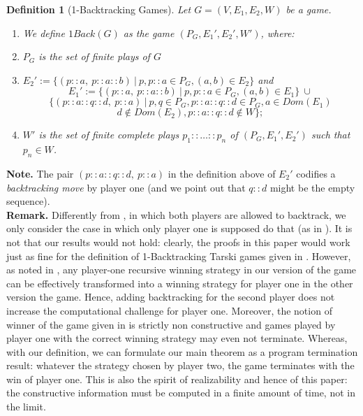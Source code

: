 \documentclass[copyright,creativecommons]{eptcs}
\newtheorem{definition}{Definition}
\begin{document}
\begin{definition}[1-Backtracking Games]
\label{definition-1BacktrackingGames} Let
$G=(V,E_1,E_2,W)$ be a game.

\begin{enumerate}

\item
We define $1Back(G)$ as the game $(P_G, E_1',E_2', W')$, where:\\
\item $P_G$ is the set of finite plays of $G$\\

\item  $E_2':=\{(p::a,\ p::a::b)\ |\  p, p::a\in P_G,
(a,b)\in
E_2 \}$ and \[E_1':=\{(p::a,\ p::a::b)\ |\  p, p::a\in P_G,  (a,b)\in
E_1\}\ \cup\] \[\{(p::a::q::d,\ p::a)\ |\ p, q\in P_G, p::a::q::d\in P_G, a\in Dom(E_1)\]\[
d\notin Dom(E_2), p::a::q::d\notin W \};\]
\item $W'$ is  the set of finite complete plays $p_1::\ldots :: p_n$ of
$(P_G, E_1', E_2')$ such that $p_n\in W$.
\end{enumerate}
\end{definition}
\textbf{Note.} The pair $(p::a::q::d,\ p::a)$ in the definition above of $E_2'$ codifies a {\em backtracking move} by player one (and we point out that $q::d$ might be the empty sequence).\\
\textbf{Remark.} Differently from \cite{BerCoq}, in which both players are allowed to backtrack, we only consider the case in which only player one is supposed do that (as in \cite{Hayashi1}). It is not that our results would not hold: clearly, the proofs in this paper would work just as fine for the definition of 1-Backtracking Tarski games given in \cite{BerCoq}. However, as noted in \cite{BerCoq}, any player-one recursive winning strategy in our version of the game can be effectively transformed into a winning strategy for player one in the other version the game. Hence, adding backtracking for the second player does not increase the computational challenge for player one.
 Moreover, the notion of winner of the game given in \cite{BerCoq} is strictly non constructive and games played by player one with the correct winning strategy may even not terminate. Whereas, with our definition, we can formulate our main theorem as a program termination result: whatever the strategy chosen by player two, the game terminates with the win of player one. This is also the spirit of realizability and hence of this paper: the constructive information must be computed in a finite amount of time, not in the limit. \\
 
\end{document}

